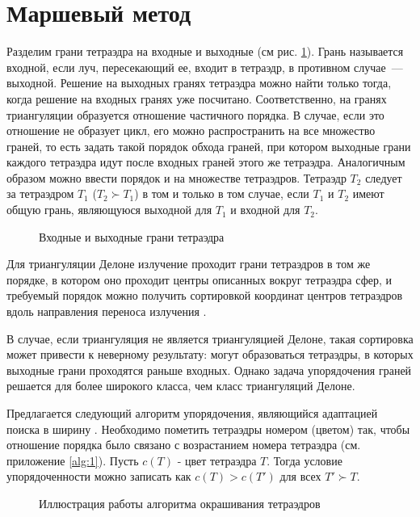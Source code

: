 \section{Маршевый метод}
Разделим грани тетраэдра на входные и выходные (см рис. \ref{fig:4}). Грань называется входной, если луч, пересекающий ее, входит в тетраэдр, в противном случае~--- выходной. Решение на выходных гранях тетраэдра можно найти только тогда, когда решение на входных гранях уже посчитано. Соответственно, на гранях триангуляции образуется отношение частичного порядка. В случае, если это отношение не образует цикл, его можно распространить на все множество граней, то есть задать такой порядок обхода граней, при котором выходные грани каждого тетраэдра идут после входных граней этого же тетраэдра. Аналогичным образом можно ввести порядок и на множестве тетраэдров. Тетраэдр $T_2$ следует за тетраэдром $T_1$ ($T_2 \succ T_1$) в том и только в том случае, если $T_1$ и $T_2$ имеют общую грань, являющуюся выходной для $T_1$ и входной для $T_2$.

\begin{figure}[ht!]
\caption{Входные и выходные грани тетраэдра}
\label{fig:4}
\end{figure}

Для триангуляции Делоне излучение проходит грани тетраэдров в том же порядке, в котором оно проходит центры описанных вокруг тетраэдра сфер, и требуемый порядок можно получить сортировкой координат центров тетраэдров вдоль направления переноса излучения \cite{skalko_2014}.

В случае, если триангуляция не является триангуляцией Делоне, такая сортировка может привести к неверному результату: могут образоваться тетраэдры, в которых выходные грани проходятся раньше входных. Однако задача упорядочения граней решается для более широкого класса, чем класс триангуляций Делоне. 

Предлагается следующий алгоритм упорядочения, являющийся адаптацией поиска в ширину \cite{corm_2009}. Необходимо пометить тетраэдры номером (цветом) так, чтобы отношение порядка было связано с возрастанием номера тетраэдра (см. приложение \ref{alg:1}). Пусть $c(T)$ - цвет тетраэдра $T$. Тогда условие упорядоченности можно записать как $ c(T) > c (T')$ для всех $T' \succ T$.

\begin{figure}[ht!]
\caption{Иллюстрация работы алгоритма окрашивания тетраэдров}
\label{fig:}
\end{figure} 

